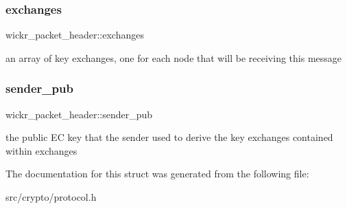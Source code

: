 \subsubsection{\texorpdfstring{exchanges}{exchanges}}
{\footnotesize\ttfamily wickr\+\_\+packet\+\_\+header\+::exchanges}

an array of key exchanges, one for each node that will be receiving this message \mbox{\label{structwickr__packet__header_aa32926d47dd2639030523593bfefc998}} 
\subsubsection{\texorpdfstring{sender\+\_\+pub}{sender\_pub}}
{\footnotesize\ttfamily wickr\+\_\+packet\+\_\+header\+::sender\+\_\+pub}

the public EC key that the sender used to derive the key exchanges contained within \textquotesingle{}exchanges\textquotesingle{} 

The documentation for this struct was generated from the following file\+:\begin{DoxyCompactItemize}
\item 
src/crypto/protocol.\+h\end{DoxyCompactItemize}
